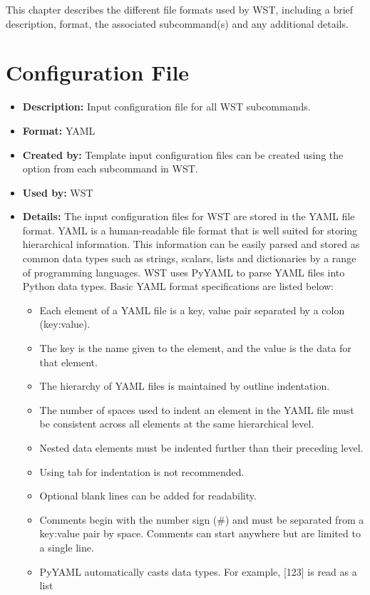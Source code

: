 This chapter describes the different file formats used by WST, including a 
brief description, format, the associated subcommand(s) and any additional details.

\section{Configuration File}\label{formats_yamlFile}
\begin{itemize}
\item {\bfseries Description:} Input configuration file for all WST subcommands.
\item {\bfseries Format:} YAML 
\item {\bfseries Created by:} Template input configuration files can be created using the  option from each subcommand in WST.
\item {\bfseries Used by:} WST
\item {\bfseries Details:} 
The input configuration files for WST are stored in the YAML file format.
YAML is a human-readable file format that is well suited for storing hierarchical 
information. This information can be easily parsed and stored as common data types 
such as strings, scalars, lists and dictionaries by a range of programming languages. 
WST uses PyYAML to parse YAML files into Python data types. Basic YAML format specifications are listed below:
\begin{itemize}
\item Each element of a YAML file is a key, value pair separated by a colon (key:value).  
\item The key is the name given to the element, and the value is the data for that element.  
\item The hierarchy of YAML files is maintained by outline indentation. 
\item The number of spaces used to indent an element in the YAML file must be consistent across all elements at the same hierarchical level.  
\item Nested data elements must be indented further than their preceding level.
\item Using tab for indentation is not recommended.
\item Optional blank lines can be added for readability. 
\item Comments begin with the number sign (\#) and must be separated from a key:value 
pair by space. Comments can start anywhere but are limited to a single line.
\item PyYAML automatically casts data types. For example, [123] is read as a list 

\end{itemize}
\end{itemize}
